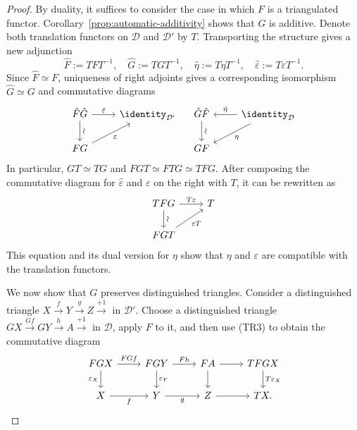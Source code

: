 \begin{proof}
	By duality, it suffices to consider the case in which $F$ is a
	triangulated functor. Corollary~\ref{prop:automatic-additivity} shows that
	$G$ is additive. Denote both translation functors on $\mathcal{D}$ and
	$\mathcal{D}'$ by $T$. Transporting the structure gives a new adjunction
	\[ \hat{F} := T F T^{-1}, \quad \hat{G} := T G T^{-1}, \quad \hat{\eta} := T\eta T^{-1}, \quad \hat{\varepsilon} := T \varepsilon T^{-1}. \]
	Since $\hat{F} \simeq F$, uniqueness of right adjoints
	\cite[Proposition~2.6.10]{Li1} gives a corresponding isomorphism
	$\hat{G} \simeq G$ and commutative diagrams
	\[\begin{tikzcd}
		\hat{F} \hat{G} \arrow[r, "\hat{\varepsilon}"] \arrow[d, "\sim" sloped] & \identity_{\mathcal{D}'} \\
		FG \arrow[ru, "{\varepsilon}"'] &
	\end{tikzcd} \quad \begin{tikzcd}
		\hat{G} \hat{F} \arrow[d, "\sim" sloped] & \identity_{\mathcal{D}} \arrow[l, "\hat{\eta}"'] \arrow[ld, "\eta"] \\
		GF &
	\end{tikzcd}\]
	In particular, $GT \simeq TG$ and
	$FGT \simeq FTG \simeq TFG$. After composing the commutative diagram for
	$\hat{\varepsilon}$ and $\varepsilon$ on the right with $T$, it can be
	rewritten as
	\begin{equation}\label{eqn:adjoint-triangulated-aux0}\begin{tikzcd}
		TFG \arrow[r, "{T\varepsilon}"] \arrow[d, "\sim" sloped] & T \\
		FGT \arrow[ru, "\varepsilon T"'] &
	\end{tikzcd}\end{equation}
	This equation and its dual version for $\eta$ show that $\eta$ and
	$\varepsilon$ are compatible with the translation functors.

	We now show that $G$ preserves distinguished triangles. Consider a
	distinguished triangle $X \xrightarrow{f} Y \xrightarrow{g} Z
	\xrightarrow{+1}$ in $\mathcal{D}'$. Choose a distinguished triangle
	$GX \xrightarrow{Gf} GY \xrightarrow{h} A \xrightarrow{+1}$ in
	$\mathcal{D}$, apply $F$ to it, and then use (TR3) to obtain the
	commutative diagram
	\begin{equation*}\begin{tikzcd}
		FG X \arrow[r, "FGf"] \arrow[d, "\varepsilon_X"'] & FG Y \arrow[d, "\varepsilon_Y"] \arrow[r, "Fh"] & FA \arrow[r] \arrow[d] & TFGX \arrow[d, "T\varepsilon_X"] \\
		X \arrow[r, "f"'] & Y \arrow[r, "g"'] & Z \arrow[r] & TX .
	\end{tikzcd}\end{equation*}


\end{proof}
